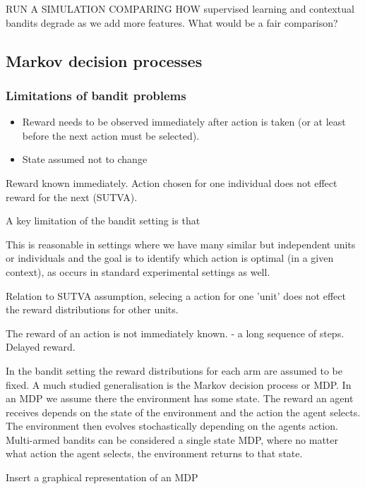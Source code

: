 RUN A SIMULATION COMPARING HOW supervised learning and contextual bandits degrade as we add more features. What would be a fair comparison?

\subsection{Markov decision processes}

\subsubsection{Limitations of bandit problems}
\begin{itemize}
\item Reward needs to be observed immediately after action is taken (or at least before the next action must be selected).
\item State assumed not to change

\end{itemize}

Reward known immediately. Action chosen for one individual does not effect reward for the next (SUTVA).



A key limitation of the bandit setting is that 

This is reasonable in settings where we have many similar but independent units or individuals and the goal is to identify which action is optimal (in a given context), as occurs in standard experimental settings as well. 

Relation to SUTVA assumption, selecing a action for one 'unit' does not effect the reward distributions for other units. 

The reward of an action is not immediately known. - a long sequence of steps. Delayed reward. 



In the bandit setting the reward distributions for each arm are assumed to be fixed. A much studied generalisation is the Markov decision process or MDP. In an MDP we assume there the environment has some state. The reward an agent receives depends on the state of the environment and the action the agent selects. The environment then evolves stochastically depending on the agents action. Multi-armed bandits can be considered a single state MDP, where no matter what action the agent selects, the environment returns to that state. 

Insert a graphical representation of an MDP

